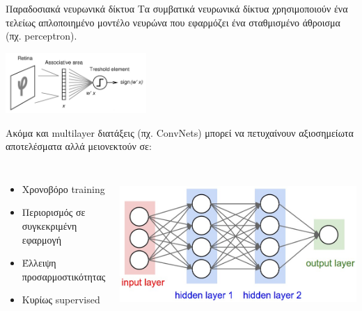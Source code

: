 \documentclass[11pt,center]{beamer}
\begin{document}
  \begin{frame}{Παραδοσιακά νευρωνικά δίκτυα}
	  Τα συμβατικά νευρωνικά δίκτυα χρησιμοποιούν ένα τελείως απλοποιημένο μοντέλο νευρώνα που εφαρμόζει ένα σταθμισμένο άθροισμα (πχ. perceptron).\\
	  \centerline{\includegraphics[width=0.4\textwidth]{../pics/perceptron.jpg}}
	  \pause
	  Ακόμα και multilayer διατάξεις (πχ. ConvNets) μπορεί να πετυχαίνουν αξιοσημείωτα αποτελέσματα αλλά μειονεκτούν σε:
	  \begin{columns}
		  \begin{itemize}
			  \item<2->[--] Χρονοβόρο training
			  \item<3->[--] Περιορισμός σε συγκεκριμένη εφαρμογή
			  \item<4->[--] Έλλειψη προσαρμοστικότητας
			  \item<5->[--] Κυρίως supervised
		  \end{itemize}
		  \\
		  \includegraphics[width=0.95 \textwidth]{../pics/multilayer.jpeg}
	  \end{columns}
  \end{frame}
\end{document}
